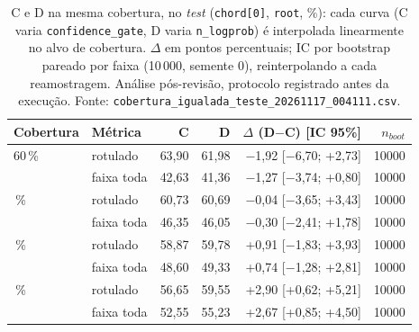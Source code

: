 \begin{table}[t]
  \centering
  \caption{C e D na mesma cobertura, no \emph{test} (\texttt{chord[0]}, \texttt{root}, \%): cada curva (C varia \texttt{confidence\_gate}, D varia \texttt{n\_logprob}) é interpolada linearmente no alvo de cobertura. $\Delta$ em pontos percentuais; IC por bootstrap pareado por faixa (10\,000, semente 0), reinterpolando a cada reamostragem. Análise pós-revisão, protocolo registrado antes da execução. Fonte: \texttt{cobertura\_igualada\_teste\_20261117\_004111.csv}.}
  \label{tab:cobertura_igualada}
  \footnotesize
  \begin{tabular}{llrrrr}
    \toprule
    Cobertura & Métrica & C & D & $\Delta$ (D$-$C) [IC 95\%] & $n_{boot}$ \\
    \midrule
    60\,\% & rotulado & 63,90 & 61,98 & $-$1,92 [$-$6,70; +2,73] & 10000 \\
     & faixa toda & 42,63 & 41,36 & $-$1,27 [$-$3,74; +0,80] & 10000 \\
    \addlinespace
    70\,\% & rotulado & 60,73 & 60,69 & $-$0,04 [$-$3,65; +3,43] & 10000 \\
     & faixa toda & 46,35 & 46,05 & $-$0,30 [$-$2,41; +1,78] & 10000 \\
    \addlinespace
    77\,\% & rotulado & 58,87 & 59,78 & +0,91 [$-$1,83; +3,93] & 10000 \\
     & faixa toda & 48,60 & 49,33 & +0,74 [$-$1,28; +2,81] & 10000 \\
    \addlinespace
    90\,\% & rotulado & 56,65 & 59,55 & +2,90 [+0,62; +5,21] & 10000 \\
     & faixa toda & 52,55 & 55,23 & +2,67 [+0,85; +4,50] & 10000 \\
    \bottomrule
  \end{tabular}
\end{table}
